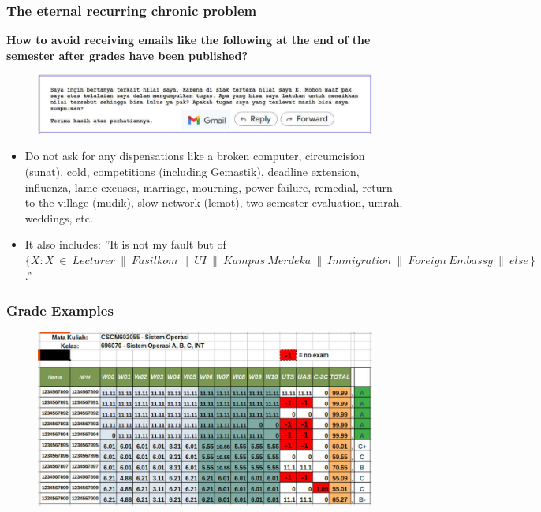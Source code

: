 \documentclass[aspectratio=169, xcolor=table, notheorems, hyperref={pdfpagelabels=false}]{beamer}
\begin{document}
\begin{frame}[fragile]
\frametitle{The eternal recurring chronic problem}

\textbf{How to avoid receiving emails like the following at the end of the semester after grades have
        been published?}

\begin{figure}
\includegraphics[width=1.01\linewidth]{os-appeal}
\end{figure}

\begin{itemize}
\item Do not ask for any dispensations like a broken computer, circumcision (sunat), cold, competitions
      (including Gemastik), deadline extension, influenza, lame excuses, marriage, mourning,
      power failure, remedial, return to the village (mudik), slow network (lemot), two-semester evaluation, umrah,
      weddings, etc.
\item It also includes: ''It is not my fault but of $\{ X\!: X\ \in\ Lecturer\ \parallel\ Fasilkom\
      \parallel\ UI\ \parallel\ Kampus\ Merdeka\ \parallel\ Immigration\ \parallel\ Foreign\ Embassy\ \parallel\
      else\, \}$.''
\end{itemize}

\end{frame}

\begin{frame}[fragile]
\frametitle{Grade Examples}

\begin{figure}
\includegraphics[width=0.94\linewidth]{os-siak}
\end{figure}

\end{frame}
\end{document}
